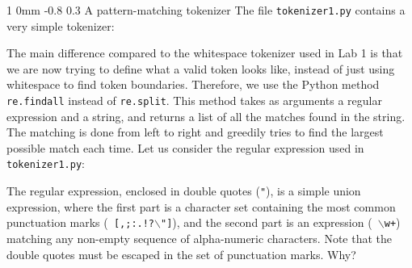 \documentclass[11pt]{article}
\makeatletter
\newcommand{\newsec}[2]{\section{#1}\label{sec:#2}\noindent}
\renewcommand{\section}{\@startsection
{section}%
{1}%
{0mm}%
{-0.8\baselineskip}%
{0.3\baselineskip}%
{\bfseries\large}}%
\renewcommand{\paragraph}{%
  \@startsection{paragraph}{4}%
  {\z@}{1.5ex \@plus 1ex \@minus .2ex}{-1em}%
  {\normalfont\normalsize\bfseries}%
}\makeatother
\makeatother
\begin{document}
\newsec{A pattern-matching tokenizer}{tokenize}%
The file {\tt tokenizer1.py} contains a very simple tokenizer:
\begin{center}
\fbox{

}
\end{center}
The main difference compared to the whitespace tokenizer used in
Lab 1 is that we are now trying to define what a valid token
looks like, instead of just using whitespace to find token
boundaries. Therefore, we use the Python method {\tt re.findall}
instead of {\tt re.split}. This method takes as arguments a regular
expression and a string, and returns a list of all the matches found
in the string. The matching is done from left to right and greedily
tries to find the largest possible match each time. Let us consider
the regular expression used in {\tt tokenizer1.py}:
\begin{center}
\fbox{

}
\end{center}
The regular expression, enclosed in double quotes ({\tt "}), is a
simple union expression, where the first part is a character set
containing the most common punctuation marks ({\tt
  [,;:.!?$\backslash$"]}), and the second part is an expression ({\tt
  $\backslash$w+}) matching any non-empty sequence of alpha-numeric
characters. Note that the double quotes must be escaped in the set of
punctuation marks. Why?

\end{document}
